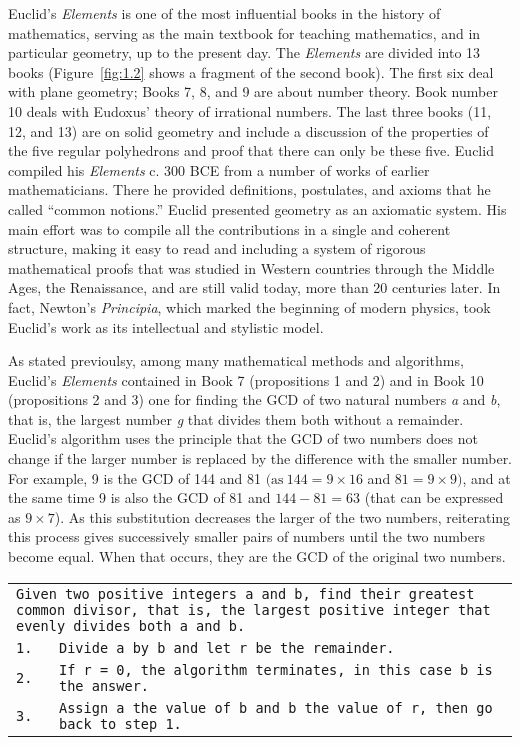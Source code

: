 {Euclid's \textit{Elements} is one of the most influential books in the history of mathematics, serving as the main textbook for teaching mathematics, and in particular geometry, up to the present day. The \textit{Elements} are divided into 13 books (Figure~\ref{fig:1.2} shows a fragment of the second book). The first six deal with plane geometry; Books 7, 8, and 9 are about number theory. Book number 10 deals with Eudoxus' theory of irrational numbers. The last three books (11, 12, and 13) are on solid geometry and include a discussion of the properties of the five regular polyhedrons and proof that there can only be these five. Euclid compiled his \textit{Elements} c. 300 BCE from a number of works of earlier mathematicians. There he provided definitions, \hbox{postulates,} and axioms that he called\vadjust{\vspace*{-17pt}\pagebreak} ``common notions.'' Euclid presented \hbox{geometry} as an axiomatic system. His main effort was to compile all the contributions in a single and coherent structure, making it easy to read and including a system of rigorous mathematical proofs that was studied in Western countries through the Middle Ages, the Renaissance, and are still valid today, more than 20 centuries later. In fact, Newton's \textit{Principia}, which marked the beginning of modern physics, took Euclid's work as its intellectual and stylistic model.

As stated previoulsy, among many mathematical methods and algorithms, Euclid's \textit{Elements} contained in Book 7 (propositions 1 and 2) and in Book 10 (propositions 2 and 3) one for finding the GCD of two natural numbers \textit{a} and \textit{b}, that is, the largest number \textit{g} that divides them both without a remainder. Euclid's algorithm uses the principle that the GCD of two numbers does not change if the larger number is replaced by the difference with the smaller number. For example, 9 is the GCD of 144 and 81 $(\text{as}\ 144 = 9 \times 16$ and $81 = 9 \times 9)$, and at the same time 9 is also the GCD of 81 and $144 - 81 = 63$ (that can be expressed as $9 \times 7$). As this substitution decreases the larger of the two numbers, reiterating this process gives successively smaller pairs of numbers until the two numbers become equal. When that occurs, they are the GCD of the original two numbers.

\medskip
{
\noindent \begin{tabular}{lp{325.0pt}}
\hline
\multicolumn{2}{p{.95\textwidth}}{\texttt{Given two positive integers a and b, find their greatest common divisor, that is, the largest positive integer that evenly divides both a and b.}}\\
\texttt{1.} &\texttt{Divide a by b and let r be the remainder.}\\
\texttt{2.} &\texttt{If r = 0, the algorithm terminates, in this case b is the answer.}\\
\texttt{3.} &\texttt{Assign a the value of b and b the value of r, then go back to step 1.}\\\hline
\end{tabular}

}}
